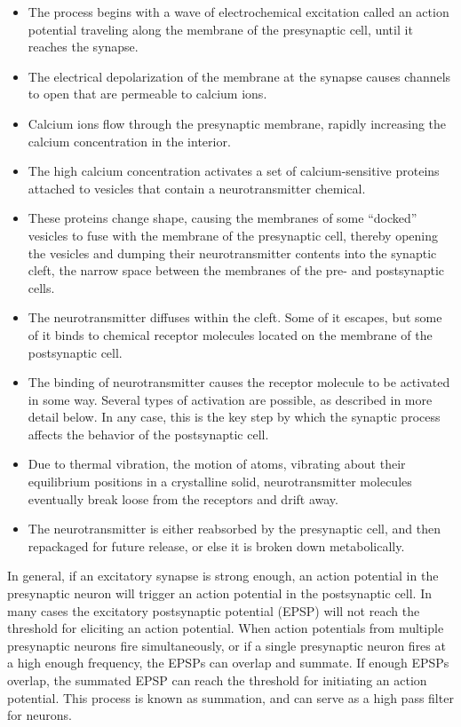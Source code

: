 \begin{itemize}
\tightlist
\item
  The process begins with a wave of electrochemical excitation called an action potential traveling along the membrane of the presynaptic cell, until it reaches the synapse.
\item
  The electrical depolarization of the membrane at the synapse causes channels to open that are permeable to calcium ions.
\item
  Calcium ions flow through the presynaptic membrane, rapidly increasing the calcium concentration in the interior.
\item
  The high calcium concentration activates a set of calcium-sensitive proteins attached to vesicles that contain a neurotransmitter chemical.
\item
  These proteins change shape, causing the membranes of some ``docked'' vesicles to fuse with the membrane of the presynaptic cell, thereby opening the vesicles and dumping their neurotransmitter contents into the synaptic cleft, the narrow space between the membranes of the pre- and postsynaptic cells.
\item
  The neurotransmitter diffuses within the cleft. Some of it escapes, but some of it binds to chemical receptor molecules located on the membrane of the postsynaptic cell.
\item
  The binding of neurotransmitter causes the receptor molecule to be activated in some way. Several types of activation are possible, as described in more detail below. In any case, this is the key step by which the synaptic process affects the behavior of the postsynaptic cell.
\item
  Due to thermal vibration, the motion of atoms, vibrating about their equilibrium positions in a crystalline solid, neurotransmitter molecules eventually break loose from the receptors and drift away.
\item
  The neurotransmitter is either reabsorbed by the presynaptic cell, and then repackaged for future release, or else it is broken down metabolically.
\end{itemize}

In general, if an excitatory synapse is strong enough, an action potential in the presynaptic neuron will trigger an action potential in the postsynaptic cell. In many cases the excitatory postsynaptic potential (EPSP) will not reach the threshold for eliciting an action potential. When action potentials from multiple presynaptic neurons fire simultaneously, or if a single presynaptic neuron fires at a high enough frequency, the EPSPs can overlap and summate. If enough EPSPs overlap, the summated EPSP can reach the threshold for initiating an action potential. This process is known as summation, and can serve as a high pass filter for neurons.

